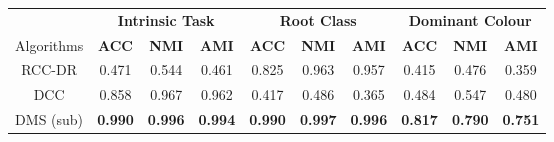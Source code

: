 
\setlength\tabcolsep{4.5pt}
\renewcommand{\arraystretch}{1.2}

 


\begin{tabular}{|c|ccc|ccc|ccc|}
\hline
 & \multicolumn{3}{c|}{\textbf{Intrinsic Task} } & \multicolumn{3}{c|}{\textbf{Root Class} } & \multicolumn{3}{c|}{\textbf{Dominant Colour}}\\
 
Algorithms & \textbf{ACC} & \textbf{NMI} & \textbf{AMI} & \textbf{ACC} & \textbf{NMI} & \textbf{AMI} & \textbf{ACC} & \textbf{NMI} & \textbf{AMI} \\
\hline
RCC-DR & 0.471 & 0.544 & 0.461 & 0.825 & 0.963 & 0.957 & 0.415 & 0.476 & 0.359 \\
DCC & 0.858 & 0.967 & 0.962 & 0.417 & 0.486 & 0.365 & 0.484 & 0.547 & 0.480 \\ \hline 
DMS (sub) & \textbf{0.990} & \textbf{0.996} & \textbf{0.994} & \textbf{0.990} & \textbf{0.997} & \textbf{0.996} & \textbf{0.817} & \textbf{0.790} & \textbf{0.751} \\ \hline 
\end{tabular}